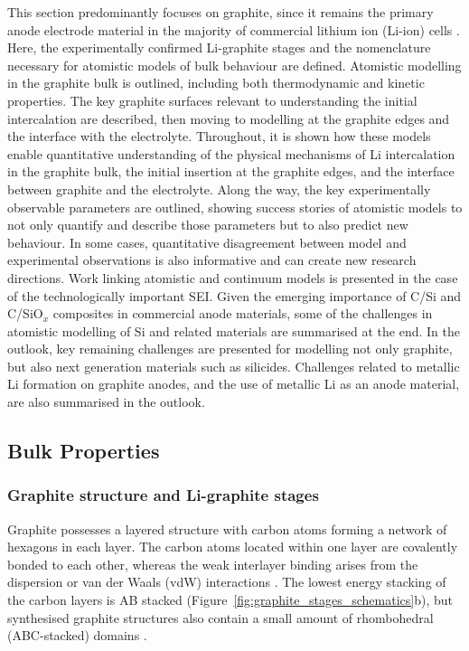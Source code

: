 \documentclass[../main.tex]{subfiles}
\begin{document}
This section predominantly focuses on graphite, since it remains the primary anode electrode material in the majority of commercial lithium ion (Li-ion) cells \cite{asenbauer_success_2020}. 
Here, the experimentally confirmed Li-graphite stages and the nomenclature necessary for atomistic models of bulk behaviour are defined. Atomistic modelling in the graphite bulk is outlined, including both thermodynamic and kinetic properties. The key graphite surfaces relevant to understanding the initial intercalation are described, then moving to modelling at the graphite edges and the interface with the electrolyte. Throughout, it is shown how these models enable quantitative understanding of the physical mechanisms of Li intercalation in the graphite bulk, the initial insertion at the graphite edges, and the interface between graphite and the electrolyte. Along the way, the key experimentally observable parameters are outlined, showing success stories of atomistic models to not only quantify and describe those parameters but to also predict new behaviour. In some cases, quantitative disagreement between model and experimental observations is also informative and can create new research directions. Work linking atomistic and continuum models is presented in the case of the technologically important SEI. Given the emerging importance of C/Si and C/SiO$_x$ composites in commercial anode materials, some of the challenges in atomistic modelling of Si and related materials are summarised at the end. In the outlook, key remaining challenges are presented for modelling not only graphite, but also next generation materials such as silicides. Challenges related to metallic Li formation on graphite anodes, and the use of metallic Li as an anode material, are also summarised in the outlook.  

\subsection{Bulk Properties}
\label{sec:anode_bulk}

\subsubsection{Graphite structure and Li-graphite stages}
\label{sec:anodes_structure_stages}

Graphite possesses a layered structure with carbon atoms forming a network of hexagons in each layer. The carbon atoms located within one layer are covalently bonded to each other, whereas the weak interlayer binding arises from the dispersion or van der Waals (vdW) interactions \cite{GUERARD1975337,Woo1983,persson2010,Woo1983,Dahn1991,hazrati_li_2014,Konar2015}. The lowest energy stacking of the carbon layers is AB stacked (Figure~\ref{fig:graphite_stages_schematics}b), but synthesised graphite structures also contain a small amount of rhombohedral (ABC-stacked) domains \cite{Shi_1996}. 
\end{document}
